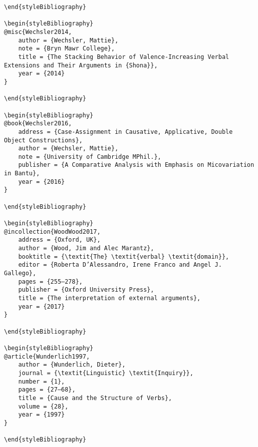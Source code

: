 \documentclass[output=paper,modfonts,nonflat]{langsci/langscibook}
\begin{document}
\begin{verbatim}
\end{styleBibliography}

\begin{styleBibliography}
@misc{Wechsler2014,
	author = {Wechsler, Mattie},
	note = {Bryn Mawr College},
	title = {The Stacking Behavior of Valence-Increasing Verbal Extensions and Their Arguments in {Shona}},
	year = {2014}
}

\end{styleBibliography}

\begin{styleBibliography}
@book{Wechsler2016,
	address = {Case-Assignment in Causative, Applicative, Double Object Constructions},
	author = {Wechsler, Mattie},
	note = {University of Cambridge MPhil.},
	publisher = {A Comparative Analysis with Emphasis on Micovariation in Bantu},
	year = {2016}
}

\end{styleBibliography}

\begin{styleBibliography}
@incollection{WoodWood2017,
	address = {Oxford, UK},
	author = {Wood, Jim and Alec Marantz},
	booktitle = {\textit{The} \textit{verbal} \textit{domain}},
	editor = {Roberta D’Alessandro, Irene Franco and Angel J. Gallego},
	pages = {255–278},
	publisher = {Oxford University Press},
	title = {The interpretation of external arguments},
	year = {2017}
}

\end{styleBibliography}

\begin{styleBibliography}
@article{Wunderlich1997,
	author = {Wunderlich, Dieter},
	journal = {\textit{Linguistic} \textit{Inquiry}},
	number = {1},
	pages = {27–68},
	title = {Cause and the Structure of Verbs},
	volume = {28},
	year = {1997}
}

\end{styleBibliography}

\end{verbatim}
\sloppy\printbibliography[heading=subbibliography,notkeyword=this]
\end{document}
